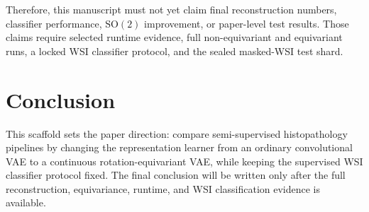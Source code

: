 \documentclass[conference]{IEEEtran}
\begin{document}
Therefore, this manuscript must not yet claim final reconstruction numbers,
classifier performance, $\mathrm{SO}(2)$ improvement, or paper-level test
results. Those claims require selected runtime evidence, full non-equivariant
and equivariant runs, a locked WSI classifier protocol, and the sealed masked-WSI
test shard.

\section{Conclusion}

This scaffold sets the paper direction: compare semi-supervised histopathology
pipelines by changing the representation learner from an ordinary convolutional
VAE to a continuous rotation-equivariant VAE, while keeping the supervised WSI
classifier protocol fixed. The final conclusion will be written only after the
full reconstruction, equivariance, runtime, and WSI classification evidence is
available.



\end{document}
